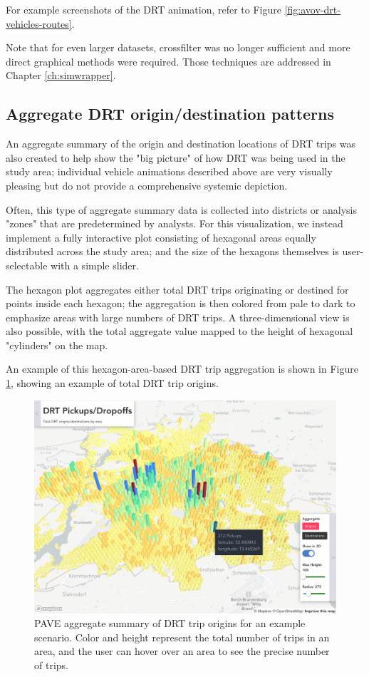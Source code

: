 For example screenshots of the DRT animation, refer to Figure \ref{fig:avov-drt-vehicles-routes}.

Note that for even larger datasets, crossfilter was no longer sufficient and more direct graphical methods were required. Those techniques are addressed in Chapter \ref{ch:simwrapper}.

\subsection{Aggregate DRT origin/destination patterns}
\label{pave-od-hexagons}

An aggregate summary of the origin and destination locations of DRT trips was also created to help show the "big picture" of how DRT was being used in the study area; individual vehicle animations described above are very visually pleasing but do not provide a comprehensive systemic depiction.

Often, this type of aggregate summary data is collected into districts or analysis "zones" that are predetermined by analysts. For this visualization, we instead implement a fully interactive plot consisting of hexagonal areas equally distributed across the study area; and the size of the hexagons themselves is user-selectable with a simple slider.

The hexagon plot aggregates either total DRT trips originating or destined for points inside each hexagon; the aggregation is then colored from pale to dark to emphasize areas with large numbers of DRT trips. A three-dimensional view is also possible, with the total aggregate value mapped to the height of hexagonal "cylinders" on the map.

An example of this hexagon-area-based DRT trip aggregation is shown in Figure \ref{fig:pave-xy-origins}, showing an example of total DRT trip origins.

\begin{figure}[ht]
\centering
  \includegraphics[width=0.95\linewidth]{chapters/23-pave/images/fig-xy-origins.png}
\caption{PAVE aggregate summary of DRT trip origins for an example scenario. Color and height represent the total number of trips in an area, and the user can hover over an area to see the precise number of trips.}
\label{fig:pave-xy-origins}
\end{figure}

